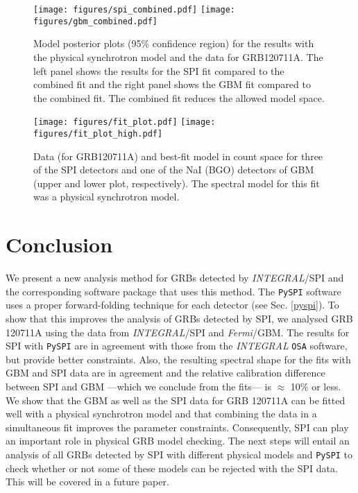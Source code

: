 \documentclass{aa}
\begin{document}
\begin{figure*}
  \begin{centering}
    \texttt{[image: figures/spi\_combined.pdf]}
    \texttt{[image: figures/gbm\_combined.pdf]}
    \caption{Model posterior plots (95\% confidence region) for the results with the physical synchrotron model and the data for GRB120711A. The left panel shows the results for the SPI fit compared to the combined fit and the right panel shows the GBM fit compared to the combined fit. The combined fit reduces the allowed model space.}
    \label{fig:model_plot_syn}
  \end{centering}
\end{figure*}
\begin{figure*}
  \begin{centering}
    \texttt{[image: figures/fit\_plot.pdf]}
    \texttt{[image: figures/fit\_plot\_high.pdf]}
    \caption{Data (for GRB120711A) and best-fit model in count space for three of the SPI detectors and one of the NaI (BGO) detectors of GBM  (upper  and lower plot, respectively). The spectral model for this fit was a physical synchrotron model.}
    \label{fig:dataplot}
  \end{centering}
\end{figure*}

\section{Conclusion}
\label{conclusion}
We present a new analysis method for GRBs detected by \textit{INTEGRAL}/SPI and the corresponding software package that uses this method. The {\tt PySPI} software uses a proper forward-folding technique for each detector (see Sec. \ref{pyspi}). To show that this improves the analysis of GRBs detected by SPI, we analysed GRB 120711A using the data from \textit{INTEGRAL}/SPI and \textit{Fermi}/GBM. The results for SPI with {\tt PySPI} are in agreement with those from the \textit{INTEGRAL} {\tt OSA} software, but provide better constraints. Also, the resulting spectral shape for the fits with GBM and SPI data are in agreement and the relative calibration difference between SPI and GBM ---which we conclude from the fits--- is $\approx$ 10\% or less. We show that the GBM as well as the SPI data for GRB 120711A can be fitted well with a physical synchrotron model and that combining the data in a simultaneous fit improves the parameter constraints. Consequently, SPI can play an important role in physical GRB model checking.
The next steps will entail an analysis of all GRBs detected by SPI with different physical models and {\tt PySPI} to check whether or not some of these models can be rejected with the SPI data. This will be covered in a future paper.
\end{document}
